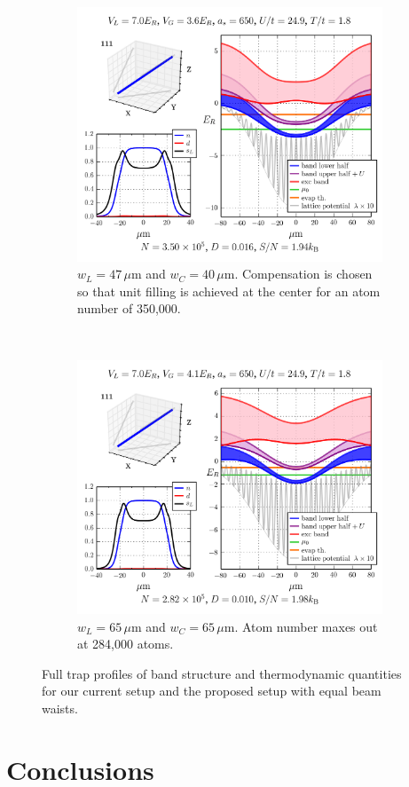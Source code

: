 \documentclass[11pt,letter]{article}
\begin{document}
\begin{figure}
        \centering
        \begin{subfigure}[t]{0.45\textwidth}
		\includegraphics[width=\textwidth]{figures/ir47-gr40_7Er-comp3p642.png}
\caption{ $w_{L} = 47\,\mu$m and $w_{C}=40\,\mu$m.  Compensation is chosen so
that unit filling is achieved at the center for an atom number of 350,000. }
        \end{subfigure}
        ~ %
        \begin{subfigure}[t]{0.45\textwidth}
		\includegraphics[width=\textwidth]{figures/ir65-gr65_7Er-comp4p08.png}
\caption{ $w_{L} = 65\,\mu$m and $w_{C}=65\,\mu$m.  Atom number maxes out at 284,000 atoms. }
        \end{subfigure}%
	\caption{Full trap profiles of band structure and thermodynamic
quantities for our current setup and the proposed setup with equal beam waists.} 
\label{fig:etaF-before-after}
\end{figure}

 



 
\section{ Conclusions }




\end{document}
